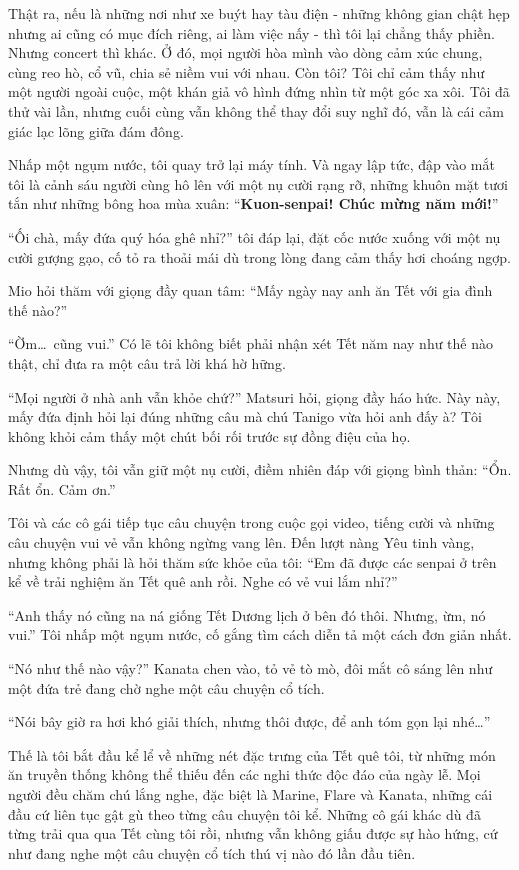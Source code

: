 \documentclass[../main.tex]{subfiles}
\begin{document}
Thật ra, nếu là những nơi như xe buýt hay tàu điện - những không gian chật hẹp nhưng ai cũng có mục đích riêng, ai làm việc nấy - thì tôi lại chẳng thấy phiền. Nhưng concert thì khác. Ở đó, mọi người hòa mình vào dòng cảm xúc chung, cùng reo hò, cổ vũ, chia sẻ niềm vui với nhau. Còn tôi? Tôi chỉ cảm thấy như một người ngoài cuộc, một khán giả vô hình đứng nhìn từ một góc xa xôi. Tôi đã thử vài lần, nhưng cuối cùng vẫn không thể thay đổi suy nghĩ đó, vẫn là cái cảm giác lạc lõng giữa đám đông.

Nhấp một ngụm nước, tôi quay trở lại máy tính. Và ngay lập tức, đập vào mắt tôi là cảnh sáu người cùng hô lên với một nụ cười rạng rỡ, những khuôn mặt tươi tắn như những bông hoa mùa xuân: ``\textbf{Kuon-senpai! Chúc mừng năm mới!}''

``Ối chà, mấy đứa quý hóa ghê nhỉ?'' tôi đáp lại, đặt cốc nước xuống với một nụ cười gượng gạo, cố tỏ ra thoải mái dù trong lòng đang cảm thấy hơi choáng ngợp.

Mio hỏi thăm với giọng đầy quan tâm: ``Mấy ngày nay anh ăn Tết với gia đình thế nào?''

``Ờm\dots\ cũng vui.'' Có lẽ tôi không biết phải nhận xét Tết năm nay như thế nào thật, chỉ đưa ra một câu trả lời khá hờ hững.

``Mọi người ở nhà anh vẫn khỏe chứ?'' Matsuri hỏi, giọng đầy háo hức. Này này, mấy đứa định hỏi lại đúng những câu mà chú Tanigo vừa hỏi anh đấy à? Tôi không khỏi cảm thấy một chút bối rối trước sự đồng điệu của họ.

Nhưng dù vậy, tôi vẫn giữ một nụ cười, điềm nhiên đáp với giọng bình thản: ``Ổn. Rất ổn. Cảm ơn.''

Tôi và các cô gái tiếp tục câu chuyện trong cuộc gọi video, tiếng cười và những câu chuyện vui vẻ vẫn không ngừng vang lên. Đến lượt nàng Yêu tinh vàng, nhưng không phải là hỏi thăm sức khỏe của tôi: ``Em đã được các senpai ở trên kể về trải nghiệm ăn Tết quê anh rồi. Nghe có vẻ vui lắm nhỉ?''

``Anh thấy nó cũng na ná giống Tết Dương lịch ở bên đó thôi. Nhưng, ừm, nó vui.'' Tôi nhấp một ngụm nước, cố gắng tìm cách diễn tả một cách đơn giản nhất.

``Nó như thế nào vậy?'' Kanata chen vào, tỏ vẻ tò mò, đôi mắt cô sáng lên như một đứa trẻ đang chờ nghe một câu chuyện cổ tích.

``Nói bây giờ ra hơi khó giải thích, nhưng thôi được, để anh tóm gọn lại nhé\dots''

Thế là tôi bắt đầu kể lể về những nét đặc trưng của Tết quê tôi, từ những món ăn truyền thống không thể thiếu đến các nghi thức độc đáo của ngày lễ. Mọi người đều chăm chú lắng nghe, đặc biệt là Marine, Flare và Kanata, những cái đầu cứ liên tục gật gù theo từng câu chuyện tôi kể. Những cô gái khác dù đã từng trải qua qua Tết cùng tôi rồi, nhưng vẫn không giấu được sự hào hứng, cứ như đang nghe một câu chuyện cổ tích thú vị nào đó lần đầu tiên.
\end{document}

